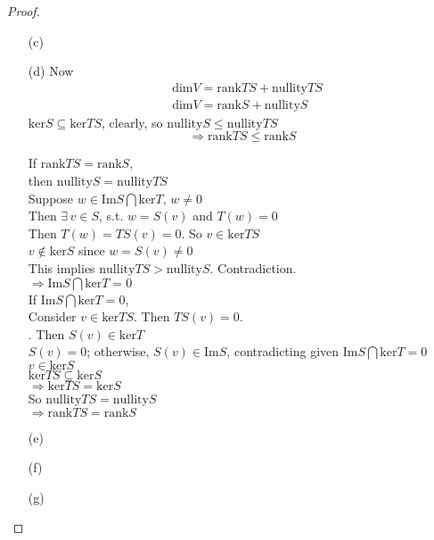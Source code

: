 \begin{proof}
\begin{enumerate}
\item[(c)]
\item[(d)] Now 
\[
\begin{aligned}
  & \text{dim}V = \text{rank}TS + \text{nullity}TS \\ 
  &  \text{dim}V = \text{rank}S + \text{nullity}S
\end{aligned}
\]
$\text{ker}S \subseteq \text{ker}TS$, clearly, so $\text{nullity}S \leq \text{nullity}TS$ 
\[
\Longrightarrow \boxed{ \text{rank}TS \leq \text{rank}S } 
\]

If $\text{rank}TS = \text{rank}S$, \\
\phantom{ \quad } then $\text{nullity}S = \text{nullity}TS$ \\
\phantom{ \, } Suppose $w \in \text{Im}S \bigcap \text{ker}T$, $w \neq 0$ \\
\phantom{ \quad } Then $\exists \,  v\in S$, s.t. $w = S(v)$ and $T(w)=0$ \\
\phantom{ \quad \, } Then $T(w) = TS(v) =0$.  So $v\in \text{ker}TS$ \\
\phantom{ \quad \quad \, } $v\notin \text{ker}S$ since $w = S(v) \neq 0$ \\
\phantom{ \quad \quad \, } This implies $\text{nullity}TS > \text{nullity}S$.  Contradiction. \\
$\Longrightarrow \text{Im}S \bigcap \text{ker}T =0$ \\

If $\text{Im}S \bigcap \text{ker}T =0$, \\
\phantom{ \quad } Consider $v \in \text{ker}TS$.  Then $TS(v)=0$.  \\
.  Then $S(v)  \in \text{ker}T$ \\
\phantom{ \quad  } $S(v) =0$; otherwise, $S(v) \in \text{Im}S$, contradicting given $\text{Im}S \bigcap \text{ker}T =0$ \\
\phantom{ \quad \quad } $v\in \text{ker}S$ \\

$\text{ker}TS \subseteq \text{ker}S$\\
$\Longrightarrow \text{ker}TS = \text{ker}S$ \\
So $\text{nullity}TS = \text{nullity}S$  \\
$\Longrightarrow \text{rank}TS = \text{rank}S$ 

\item[(e)]
\item[(f)]
\item[(g)]
\end{enumerate}
\end{proof}



